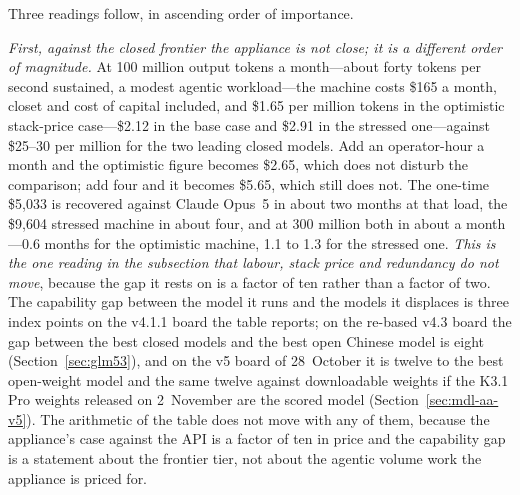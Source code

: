 Three readings follow, in ascending order of importance.

\emph{First, against the closed frontier the appliance is not close; it is a different order of magnitude.} At 100 million output tokens a month---about forty tokens per second sustained, a modest agentic workload---the machine costs \$165 a month, closet and cost of capital included, and \$1.65 per million tokens in the optimistic stack-price case---\$2.12 in the base case and \$2.91 in the stressed one---against \$25--30 per million for the two leading closed models. Add an operator-hour a month and the optimistic figure becomes \$2.65, which does not disturb the comparison; add four and it becomes \$5.65, which still does not. The one-time \$5,033 is recovered against Claude Opus~5 in about two months at that load, the \$9,604 stressed machine in about four, and at 300 million both in about a month---0.6 months for the optimistic machine, 1.1 to 1.3 for the stressed one. \emph{This is the one reading in the subsection that labour, stack price and redundancy do not move}, because the gap it rests on is a factor of ten rather than a factor of two. The capability gap between the model it runs and the models it displaces is three index points on the v4.1.1 board the table reports; on the re-based v4.3 board the gap between the best closed models and the best open Chinese model is eight (Section~\ref{sec:glm53}), and on the v5 board of 28~October it is twelve to the best open-weight model and the same twelve against downloadable weights if the K3.1 Pro weights released on 2~November are the scored model (Section~\ref{sec:mdl-aa-v5}). The arithmetic of the table does not move with any of them, because the appliance's case against the API is a factor of ten in price and the capability gap is a statement about the frontier tier, not about the agentic volume work the appliance is priced for.

